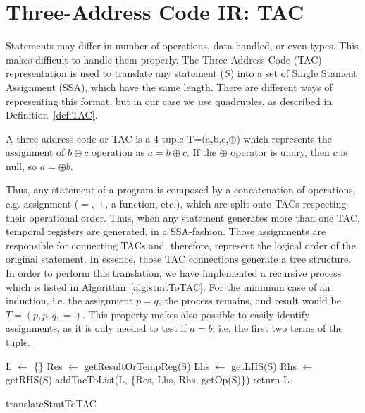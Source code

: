 \section{Three-Address Code IR: TAC}
Statements may differ in number of operations, data handled, or even types. 
This makes difficult to handle them properly.  The Three-Address Code (TAC) 
representation is used to translate any statement ($S$) into a
set of Single Stament Assignment (SSA), which have the same length. There are 
different ways of representing this format, but in our case we use quadruples, 
as described in Definition~\ref{def:TAC}.

\theoremstyle{definition}
\begin{definition}\label{def:TAC}
	A three-address code or TAC is a 4-tuple T=(a,b,c,$\oplus$) which 
	represents the assignment of $b \oplus c$ operation as $a=b \oplus c$. 
	If the $\oplus$ operator is unary, then $c$ is null, so $a=\oplus b$.
\end{definition}

Thus, any statement of a program is composed by a concatenation of operations, 
e.g. assignment ($=$, $+$, a function, etc.), 
which are 
split onto TACs respecting  their operational order. Thus, when any statement 
generates more than one TAC, temporal registers are generated, in a 
SSA-fashion. Those assignments are 
responsible for connecting TACs and, therefore, represent the logical order of 
the original statement. In essence, those TAC connections generate a tree 
structure. In order to 
perform this translation, we have 
implemented a recursive process which is listed in 
Algorithm~\ref{alg:stmtToTAC}. For the minimum case of an induction, i.e. the 
assignment $p = q$, the process remains, and result would be $T = (p,p,q,=)$. 
This property makes also possible to easily identify assignments, as it is only 
needed to test if $a=b$, i.e. the first two terms of the tuple.

\begin{algorithm}[h]\label{alg:stmtToTAC}
	\SetAlgoLined
	L $\leftarrow$ \{\}\;
	Res $\leftarrow$ getResultOrTempReg(S)\;
	Lhs $\leftarrow$ getLHS(S)\;
	Rhs $\leftarrow$ getRHS(S)\;
	addTacToList(L, \{Res, Lhs, Rhs, getOp(S)\})\;
	return L\;
	\caption{translateStmtToTAC}
\end{algorithm}

